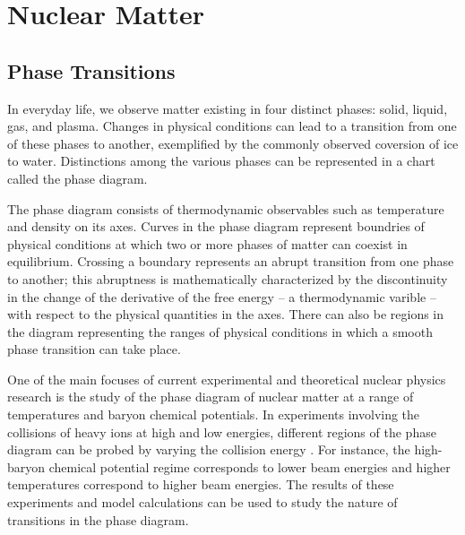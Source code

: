 
\section{Nuclear Matter}

\subsection{Phase Transitions}
In everyday life, we observe matter existing in four distinct phases: solid, liquid, gas, and plasma. Changes in physical conditions can lead to a transition from one of these phases to another, exemplified by the commonly observed coversion of ice to water. Distinctions among the various phases can be represented in a chart called the phase diagram.

The phase diagram consists of thermodynamic observables such as temperature and density on its axes. Curves in the phase diagram represent boundries of physical conditions at which two or more phases of matter can coexist in equilibrium. Crossing a boundary represents an abrupt transition from one phase to another; this abruptness is mathematically characterized by the discontinuity in the change of the derivative of the free energy -- a thermodynamic varible -- with respect to the physical quantities in the axes. There can also be regions in the diagram representing the ranges of physical conditions in which a smooth phase transition can take place.

One of the main focuses of current experimental and theoretical nuclear physics research is the study of the phase diagram of nuclear matter at a range of temperatures and baryon chemical potentials. In experiments involving the collisions of heavy ions at high and low energies, different regions of the phase diagram can be probed by varying the collision energy \cite{PhysRevC.93.024901}. For instance, the high-baryon chemical potential regime corresponds to lower beam energies and higher temperatures correspond to higher beam energies. The results of these experiments and model calculations can be used to study the nature of transitions in the phase diagram.

